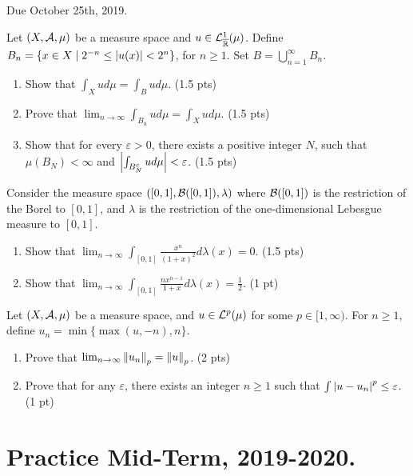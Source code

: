 Due October 25th, 2019.

\begin{ex}
	Let $(X, \mathcal{A}, \mu)$ be a measure space and $u \in \mathcal{L}^1_{\overline{\mathbb{R}}}(\mu)$. Define $B_n = \{ x \in X \mid 2^{-n} \leq \left\vert{u(x)}\right\vert < 2^n\}$, for $n \geq 1$. Set $B = \bigcup_{n = 1}^\infty B_n$.
	
	\begin{enumerate}
		\item Show that $\int_X u d\mu = \int_B u d\mu$. (1.5 pts)
		\item Prove that $\lim_{n \to \infty} \int_{B_n} u d\mu = \int_X u d\mu$. (1.5 pts)
		\item Show that for every $\varepsilon > 0$, there exists a positive integer $N$, such that $\mu(B_N) < \infty$ and $\left\vert{\int_{B_N^c} ud\mu}\right\vert < \varepsilon$. (1.5 pts)
	\end{enumerate}
\end{ex}

\begin{ex}
	Consider the measure space $([0,1], \mathcal{B}([0, 1]), \lambda)$ where $\mathcal{B}([0,1])$ is the restriction of the Borel \siga to $[0,1]$, and $\lambda$ is the restriction of the one-dimensional Lebesgue measure to $[0,1]$.
	
	\begin{enumerate}
		\item Show that $\lim_{n \to \infty} \int_{[0,1]} \frac{x^n}{(1+ x)^2}d\lambda(x) = 0$. (1.5 pts)
		\item Show that $\lim_{n \to \infty} \int_{[0,1]} \frac{n x^{n-1}}{1 + x} d\lambda(x) = \frac{1}{2}$. (1 pt)
	\end{enumerate}
\end{ex}

\begin{ex}
	Let $(X, \mathcal{A}, \mu)$ be a measure space, and $u \in \mathcal{L}^p(\mu)$ for some $p \in [1, \infty)$. For $n \geq 1$, define $u_n = \min\{ \max(u, -n), n \}$.
	
	\begin{enumerate}
		\item Prove that $\lim_{n\to\infty} \left\Vert{u_n}\right\Vert_p = \left\Vert{u}\right\Vert_p$. (2 pts)
		\item Prove that for any $\varepsilon$, there exists an integer $n \geq 1$ such that $\int \left\vert{u - u_n}\right\vert^p \leq \varepsilon$. (1 pt)
	\end{enumerate}
\end{ex}

\section{Practice Mid-Term, 2019-2020.}

